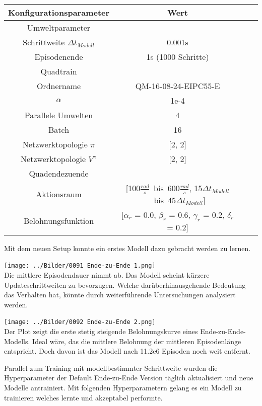 \begin{center}
\begin{tabular}[h]{|c|c|c|c|}
\hline 
Konfigurationsparameter & Wert \\
\hline 
Umweltparameter & \\
Schrittweite $\Delta t_{Modell}$ & 0.001s \\
Episodenende & 1s (1000 Schritte)\\
\hline
Quadtrain & \\
Ordnername & QM-16-08-24-EIPC55-E\\
$\alpha$ & 1e-4\\
Parallele Umwelten & 4\\
Batch & 16\\
Netzwerktopologie $\pi$ & [2, 2]\\
Netzwerktopologie $V^{\pi}$ & [2, 2]\\
\hline
Quadendezuende & \\
Aktionsraum & [100$\frac{rad}{s}$\ bis\ 600$\frac{rad}{s}$, 15$\Delta t_{Modell}$\ bis\ 45$\Delta t_{Modell}$]\\
Belohnungsfunktion & [$\alpha_r$ = 0.0, $\beta_r$ = 0.6, $\gamma_r$ = 0.2, $\delta_r$ = 0.2]\\
\hline
\end{tabular}
\end{center}
Mit dem neuen Setup konnte ein erstes Modell dazu gebracht werden zu lernen.
\begin{center}
\texttt{[image: ../Bilder/0091 Ende-zu-Ende 1.png]}{\\Die mittlere Episodendauer nimmt ab. Das Modell scheint kürzere Updateschrittweiten zu bevorzugen. Welche darüberhinausgehende Bedeutung das Verhalten hat, könnte durch weiterführende Untersuchungen analysiert werden.}
\end{center}
\begin{center}
\texttt{[image: ../Bilder/0092 Ende-zu-Ende 2.png]}{\\Der Plot zeigt die erste stetig steigende Belohnungskurve eines Ende-zu-Ende-Modells. Ideal wäre, das die mittlere Belohnung der mittleren Episodenlänge entspricht. Doch davon ist das Modell nach 11.2e6 Episoden noch weit entfernt.}
\end{center}
Parallel zum Training mit modellbestimmter Schrittweite wurden die Hyperparameter der Default Ende-zu-Ende Version täglich aktualisiert und neue Modelle antrainiert. Mit folgenden Hyperparametern gelang es ein Modell zu trainieren welches lernte und akzeptabel performte.
